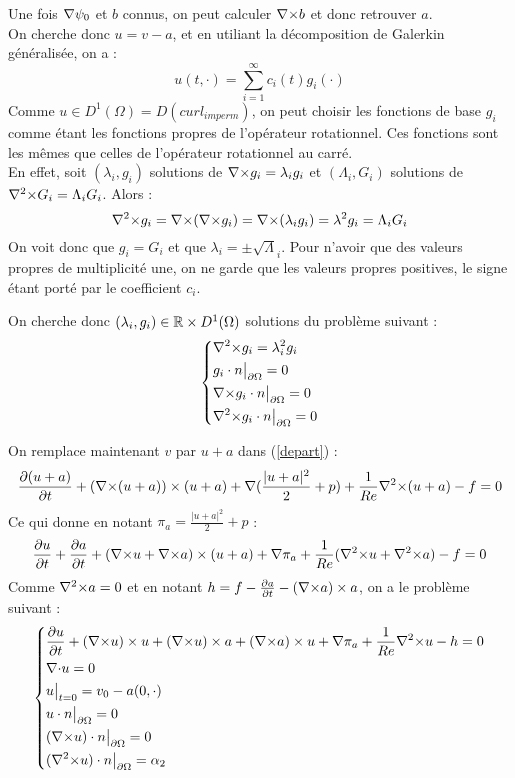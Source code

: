Une fois ${\nabla}\psi_0$ et $b$ connus, on peut calculer ${\nabla\times} b$ et donc retrouver $a$.\\

On cherche donc $u=v-a$, et en utiliant la décomposition de Galerkin généralisée, on a :
\[
u(t,\cdot) = \sum_{i=1}^{\infty} c_i(t)g_i(\cdot)
\]
Comme $u\in D^1(\Omega)=D(curl_{imperm})$, on peut choisir les fonctions de base $g_i$ comme étant les fonctions propres de l'opérateur rotationnel. Ces fonctions sont les mêmes que celles de l'opérateur rotationnel au carré.\\
En effet, soit $(\lambda_i,g_i)$ solutions de ${\nabla\times} g_i = \lambda_ig_i$ et $(\Lambda_i,G_i)$ solutions de ${\nabla^2\times} G_i = \Lambda_iG_i$. Alors :
\[
{\nabla^2\times} g_i = {\nabla\times}({\nabla\times} g_i)={\nabla\times}(\lambda_ig_i)=\lambda^2g_i = \Lambda_iG_i
\]
On voit donc que $g_i=G_i$ et que $\lambda_i=\pm\sqrt\Lambda_i$. Pour n'avoir que des valeurs propres de multiplicité une, on ne garde que les valeurs propres positives, le signe étant porté par le coefficient $c_i$.

On cherche donc $(\lambda_i,g_i)\in{\mathbb{R}}\times D^1(\Omega)$ solutions du problème suivant :
\begin{eqnarray}
\label{curlcurl}
\left\{
\begin{aligned}
&{\nabla^2\times}  g_i = \lambda_i^2 g_i\\
&g_i\cdot n{\big\rvert_{\partial\Omega}} = 0\\
&{\nabla\times} g_i\cdot n{\big\rvert_{\partial\Omega}} = 0\\
&{\nabla^2\times}  g_i\cdot n{\big\rvert_{\partial\Omega}} = 0
\end{aligned}
\right.
\end{eqnarray}

On remplace maintenant $v$ par $u+a$ dans (\ref{depart}) :
\[
\frac{\partial(u+a)}{\partial t}+({\nabla\times}(u+a))\times(u+a) + {\nabla} (\frac{|u+a|^2}{2}+p) + \frac{1}{Re}{\nabla^2\times}(u+a) - f = 0
\]
Ce qui donne en notant $\pi_a=\frac{|u+a|^2}{2}+p$ :
\[
\frac{\partial u}{\partial t}+\frac{\partial a}{\partial t} + ({\nabla\times} u+{\nabla\times} a)\times(u+a) + {\nabla}\pi_a + \frac{1}{Re}({\nabla^2\times} u+{\nabla^2\times} a) - f = 0
\]
Comme ${\nabla^2\times} a = 0$ et en notant $h=f-\frac{\partial a}{\partial t} - ({\nabla\times} a)\times a$, on a le problème suivant :
\begin{eqnarray}
\label{uci}
\left\{
\begin{aligned}
&\frac{\partial u}{\partial t} + ({\nabla\times} u)\times u + ({\nabla\times} u)\times a +({\nabla\times} a)\times u + {\nabla} \pi_a +\frac{1}{Re}{\nabla^2\times}  u - h = 0\\
&{\nabla\cdot} u = 0\\
&u\big\rvert_{t=0} = v_0 - a(0,\cdot)\\
&u\cdot n{\big\rvert_{\partial\Omega}} = 0\\
&({\nabla\times} u)\cdot n{\big\rvert_{\partial\Omega}} = 0\\
&({\nabla^2\times}  u)\cdot n{\big\rvert_{\partial\Omega}} = \alpha_2
\end{aligned}
\right.
\end{eqnarray}

